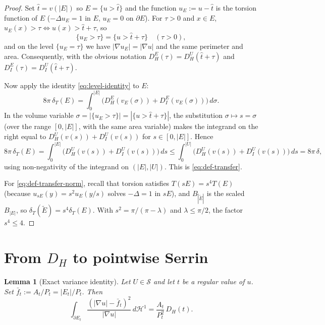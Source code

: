 \documentclass[11pt]{amsart}
\newtheorem{lemma}[theorem]{Lemma}
\newcommand{\dT}{\delta_T}
\newcommand{\HH}{\mathcal H}
\newcommand{\Etil}{\widetilde E}
\newcommand{\Sclass}{\mathcal S}
\begin{document}
\begin{proof}
Set \(\hat t=v(|E|)\) so \(E=\{u>\hat t\}\) and the function
\(u_E:=u-\hat t\) is the torsion function of \(E\)
(\(-\Delta u_E=1\) in \(E\), \(u_E=0\) on \(\partial E\)).  For
\(\tau>0\) and \(x\in E\), \(u_E(x)>\tau\iff u(x)>\hat t+\tau\), so
\[
   \{u_E>\tau\}=\{u>\hat t+\tau\}\quad(\tau>0),
\]
and on the level \(\{u_E=\tau\}\) we have
\(|\nabla u_E|=|\nabla u|\) and the same perimeter and area.
Consequently, with the obvious notation
\(D_H^E(\tau)=D_H^U(\hat t+\tau)\) and
\(D_I^E(\tau)=D_I^U(\hat t+\tau)\).

Now apply the identity \eqref{eq:level-identity} to \(E\):
\[
   8\pi\,\dT(E)
      =\int_0^{|E|}
      \bigl(D_H^E(v_E(\sigma))+D_I^E(v_E(\sigma))\bigr)
      \,d\sigma.
\]
In the volume variable \(\sigma=|\{u_E>\tau\}|=|\{u>\hat t+\tau\}|\),
the substitution \(\sigma\mapsto s=\sigma\) (over the range
\([0,|E|]\), with the same area variable) makes the integrand on the
right equal to \(D_H^U(v(s))+D_I^U(v(s))\) for \(s\in[0,|E|]\).  Hence
\[
   8\pi\,\dT(E)
      =\int_0^{|E|}\bigl(D_H^U(v(s))+D_I^U(v(s))\bigr)\,ds
      \le\int_0^{|U|}\bigl(D_H^U(v(s))+D_I^U(v(s))\bigr)\,ds
      =8\pi\,\delta,
\]
using non-negativity of the integrand on \((|E|,|U|)\).  This is
\eqref{eq:def-transfer}.

For \eqref{eq:def-transfer-norm}, recall that torsion satisfies
\(T(sE)=s^4 T(E)\) (because \(u_{sE}(y)=s^2 u_E(y/s)\) solves
\(-\Delta=1\) in \(sE\)), and \(B_{|\Etil|}\) is the scaled
\(B_{|E|}\), so \(\dT(\Etil)=s^4\dT(E)\).  With
\(s^2=\pi/(\pi-\lambda)\) and \(\lambda\le\pi/2\), the factor
\(s^4\le 4\).
\end{proof}

\section{From \(D_H\) to pointwise Serrin}

\begin{lemma}[Exact variance identity]\label{lem:variance}
Let \(U\in\Sclass\) and let \(t\) be a regular value of \(u\).  Set
\(\bar f_t:=A_t/P_t=|E_t|/P_t\).  Then
\begin{equation}\label{eq:variance}
   \int_{\partial E_t}\frac{(|\nabla u|-\bar f_t)^2}{|\nabla u|}\,
      d\HH^1
      =
   \frac{A_t}{P_t^{2}}\,D_H(t).
\end{equation}
\end{lemma}
\end{document}
